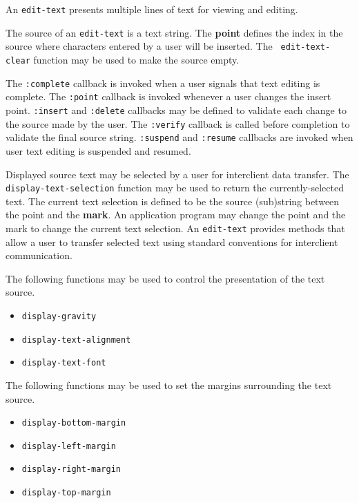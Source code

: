 \vfill
\pagebreak



An {\tt edit-text} presents multiple lines of text for viewing and editing.

The source of an {\tt edit-text} is a text string.  The {\bf
point} defines the index in the
source where characters entered by a user will be inserted.  The {\tt
edit-text-clear} function may be used to make the source empty.

The {\tt :complete} callback is invoked when a user signals that text editing is
complete.  The {\tt :point} callback is invoked whenever a user
changes the insert point.  {\tt :insert} and {\tt :delete} callbacks may be
defined to
validate each change to the source made by the user.  The {\tt :verify} callback
is called before completion to validate the final source string. 
{\tt :suspend} and {\tt :resume} callbacks are invoked when user text editing is
suspended and resumed.

Displayed source text may be selected by a user for interclient data transfer.
The {\tt display-text-selection} function may be used to return the
currently-selected text.  The current text selection is defined to be the source
(sub)string between the point and the {\bf mark}.   An
application program may change the point and the mark to change the current text
selection.  An {\tt edit-text} provides methods that allow a user to transfer
selected text using standard conventions for interclient communication.

The following functions may be used to control the presentation of the text
source.

\begin{itemize}
\item {\tt display-gravity} 
\item {\tt display-text-alignment} 
\item {\tt display-text-font} 
\end{itemize}

The following functions may be used to set the margins surrounding the text
source.

\begin{itemize}
 \item {\tt display-bottom-margin}
 \item {\tt display-left-margin}
 \item {\tt display-right-margin}
 \item {\tt display-top-margin}
\end{itemize}


